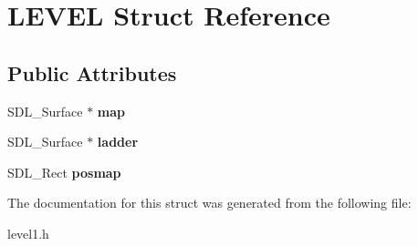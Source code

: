 \hypertarget{structLEVEL}{}\section{L\+E\+V\+EL Struct Reference}
\label{structLEVEL}
\subsection*{Public Attributes}
\begin{DoxyCompactItemize}
\item 
S\+D\+L\+\_\+\+Surface $\ast$ {\bfseries map}\hypertarget{structLEVEL_afa78c84673912f16a3fd1c3a395486c1}{}\label{structLEVEL_afa78c84673912f16a3fd1c3a395486c1}

\item 
S\+D\+L\+\_\+\+Surface $\ast$ {\bfseries ladder}\hypertarget{structLEVEL_a7c6e18d4e9b80bcada238e7b7ed26cbe}{}\label{structLEVEL_a7c6e18d4e9b80bcada238e7b7ed26cbe}

\item 
S\+D\+L\+\_\+\+Rect {\bfseries posmap}\hypertarget{structLEVEL_aa8d82bea3a0557a54284b6dc0437fc29}{}\label{structLEVEL_aa8d82bea3a0557a54284b6dc0437fc29}

\end{DoxyCompactItemize}


The documentation for this struct was generated from the following file\+:\begin{DoxyCompactItemize}
\item 
level1.\+h\end{DoxyCompactItemize}
